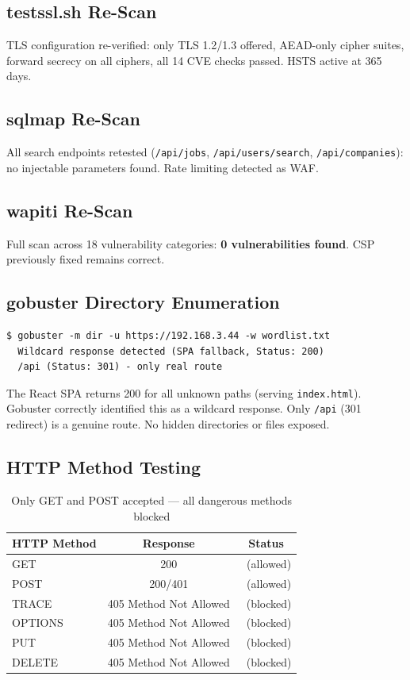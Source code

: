 \documentclass[12pt,a4paper]{article}
\newcommand{\pass}{\textcolor{success}{\checkmark}}
\begin{document}
\subsection{testssl.sh Re-Scan}

TLS configuration re-verified: only TLS 1.2/1.3 offered, AEAD-only cipher suites, forward secrecy on all ciphers, all 14 CVE checks passed. HSTS active at 365 days.

\subsection{sqlmap Re-Scan}

All search endpoints retested (\texttt{/api/jobs}, \texttt{/api/users/search}, \texttt{/api/companies}): no injectable parameters found. Rate limiting detected as WAF.

\subsection{wapiti Re-Scan}

Full scan across 18 vulnerability categories: \textbf{0 vulnerabilities found}. CSP previously fixed remains correct.

\subsection{gobuster Directory Enumeration}

\begin{lstlisting}
$ gobuster -m dir -u https://192.168.3.44 -w wordlist.txt
  Wildcard response detected (SPA fallback, Status: 200)
  /api (Status: 301) - only real route
\end{lstlisting}

The React SPA returns 200 for all unknown paths (serving \texttt{index.html}). Gobuster correctly identified this as a wildcard response. Only \texttt{/api} (301 redirect) is a genuine route. No hidden directories or files exposed.

\subsection{HTTP Method Testing}

\begin{table}[H]
\centering
\begin{tabular}{lcc}
\toprule
\textbf{HTTP Method} & \textbf{Response} & \textbf{Status} \\
\midrule
GET & 200 & \pass\ (allowed) \\
POST & 200/401 & \pass\ (allowed) \\
TRACE & 405 Method Not Allowed & \pass\ (blocked) \\
OPTIONS & 405 Method Not Allowed & \pass\ (blocked) \\
PUT & 405 Method Not Allowed & \pass\ (blocked) \\
DELETE & 405 Method Not Allowed & \pass\ (blocked) \\
\bottomrule
\end{tabular}
\caption{Only GET and POST accepted --- all dangerous methods blocked}
\end{table}
\end{document}
